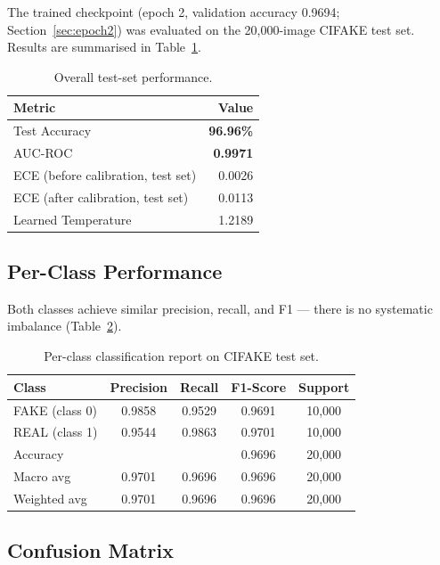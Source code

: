 \documentclass[12pt,a4paper]{article}
\begin{document}
The trained checkpoint (epoch 2, validation accuracy 0.9694; Section~\ref{sec:epoch2}) was evaluated on the 20,000-image CIFAKE test set. Results are summarised in Table~\ref{tab:overall}.

\begin{table}[ht]
\centering
\caption{Overall test-set performance.}
\label{tab:overall}
\begin{tabular}{lr}
\toprule
\textbf{Metric} & \textbf{Value} \\
\midrule
Test Accuracy                        & \textbf{96.96\%} \\
AUC-ROC                             & \textbf{0.9971} \\
ECE (before calibration, test set)   & 0.0026 \\
ECE (after calibration, test set)    & 0.0113 \\
Learned Temperature                  & 1.2189 \\
\bottomrule
\end{tabular}
\end{table}

\subsection{Per-Class Performance}

Both classes achieve similar precision, recall, and F1 --- there is no systematic imbalance (Table~\ref{tab:perclass}).

\begin{table}[ht]
\centering
\caption{Per-class classification report on CIFAKE test set.}
\label{tab:perclass}
\begin{tabular}{lcccc}
\toprule
\textbf{Class} & \textbf{Precision} & \textbf{Recall} & \textbf{F1-Score} & \textbf{Support} \\
\midrule
FAKE (class 0) & 0.9858 & 0.9529 & 0.9691 & 10,000 \\
REAL (class 1) & 0.9544 & 0.9863 & 0.9701 & 10,000 \\
\midrule
Accuracy       &        &        & 0.9696 & 20,000 \\
Macro avg      & 0.9701 & 0.9696 & 0.9696 & 20,000 \\
Weighted avg   & 0.9701 & 0.9696 & 0.9696 & 20,000 \\
\bottomrule
\end{tabular}
\end{table}

\subsection{Confusion Matrix}
\end{document}
